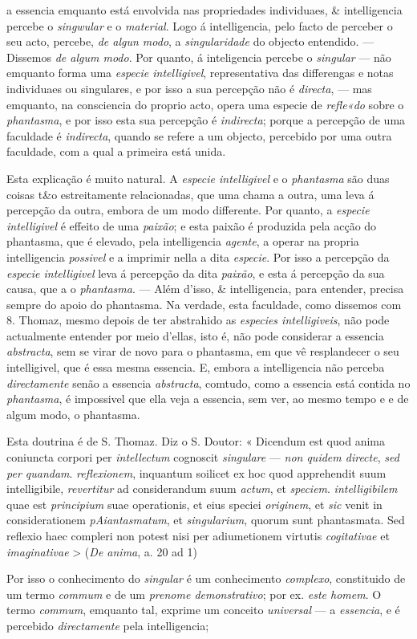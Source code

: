 a essencia emquanto está envolvida nas propriedades individuaes, \& intelligencia percebe o \emph{singwular} e o \emph{material}. Logo á intelligencia, pelo facto de perceber o seu acto, percebe, \emph{de algun modo}, a \emph{singularidade} do objecto entendido. --- Dissemos \emph{de algum modo}. Por quanto, á inteligencia percebe o \emph{singular} --- não emquanto forma uma \emph{especie intelligivel}, representativa das differengas e notas individuaes ou singulares, e por isso a sua percepção não é \emph{directa}, --- mas emquanto, na consciencia do proprio acto, opera uma especie de \emph{refle«do} sobre o \emph{phantasma}, e por isso esta sua percepção é \emph{indirecta}; porque a percepção de uma faculdade é \emph{indirecta}, quando se refere a um objecto, percebido por uma outra faculdade, com a qual a primeira está unida.\par Esta explicação é muito natural. A \emph{especie intelligivel} e o \emph{phantasma} são duas coisas t\&o estreitamente relacionadas, que uma chama a outra, uma leva á percepção da outra, embora de um modo differente. Por quanto, a \emph{especie intelligivel} é effeito de uma \emph{paixão}; e esta paixão é produzida pela acção do phantasma, que é elevado, pela intelligencia \emph{agente}, a operar na propria intelligencia \emph{possivel} e a imprimir nella a dita \emph{especie}. Por isso a percepção da \emph{especie intelligivel} leva á percepção da dita \emph{paixão}, e esta á percepção da sua causa, que a o \emph{phantasma}. --- Além d'isso, \& intelligencia, para entender, precisa sempre do apoio do phantasma. Na verdade, esta faculdade, como dissemos com 8. Thomaz, mesmo depois de ter abstrahido as \emph{especies intelligiveis}, não pode actualmente entender por meio d'ellas, isto é, não pode considerar a essencia \emph{abstracta}, sem se virar de novo para o phantasma, em que vê resplandecer o seu intelligivel, que é essa mesma essencia. E, embora a intelligencia não perceba \emph{directamente} senão a essencia \emph{abstracta}, comtudo, como a essencia está contida no \emph{phantasma}, é impossivel que ella veja a essencia, sem ver, ao mesmo tempo e e de algum modo, o phantasma.\par Esta doutrina é de S. Thomaz. Diz o S. Doutor: « Dicendum est quod anima coniuncta corpori per \emph{intellectum} cognoscit \emph{singulare} --- \emph{non quidem directe}, \emph{sed per quandam}. \emph{reflexionem}, inquantum soilicet ex hoc quod apprehendit suum intelligibile, \emph{revertitur} ad considerandum suum \emph{actum}, et \emph{speciem}. \emph{intelligibilem} quae est \emph{principium} suae operationis, et eius speciei \emph{originem}, et \emph{sic} venit in considerationem \emph{pAiantasmatum}, et \emph{singularium}, quorum sunt phantasmata. Sed reflexio haec compleri non potest nisi per adiumetionem virtutis \emph{cogitativae} et \emph{imaginativae} \textgreater{} (\emph{De anima}, a. 20 ad 1)\par Por isso o conhecimento do \emph{singular} é um conhecimento \emph{complexo}, constituido de um termo \emph{commum} e de um \emph{prenome demonstrativo}; por ex. \emph{este homem}. O termo \emph{commum}, emquanto tal, exprime um conceito \emph{universal} --- a \emph{essencia}, e é percebido \emph{directamente} pela intelligencia; 